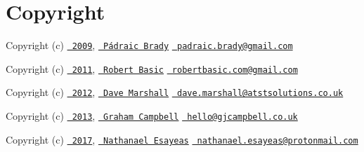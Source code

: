 \chapter{Copyright}
\hypertarget{md_vendor_2mockery_2mockery_2_c_o_p_y_r_i_g_h_t}{}\label{md_vendor_2mockery_2mockery_2_c_o_p_y_r_i_g_h_t}
\label{md_vendor_2mockery_2mockery_2_c_o_p_y_r_i_g_h_t_autotoc_md1153}%
%



\begin{DoxyItemize}
\item Copyright (c) \href{https://github.com/mockery/mockery/commit/1d96f88142abe804ab9e893a5f07933f63e9bff9}{\texttt{ 2009}}, \href{https://github.com/padraic}{\texttt{ Pádraic Brady}} \href{mailto:padraic.brady@gmail.com}{\texttt{ padraic.\+brady@gmail.\+com}}
\item Copyright (c) \href{https://github.com/mockery/mockery/commit/94dbb63aab37c659f63ea6e34acc6958928b0f59}{\texttt{ 2011}}, \href{https://github.com/robertbasic}{\texttt{ Robert Basic}} \href{mailto:robertbasic.com@gmail.com}{\texttt{ robertbasic.\+com@gmail.\+com}}
\item Copyright (c) \href{https://github.com/mockery/mockery/commit/64e3ad6960eb3202b5b91b91a4ef1cf6252f0fef}{\texttt{ 2012}}, \href{https://github.com/davedevelopment}{\texttt{ Dave Marshall}} \href{mailto:dave.marshall@atstsolutions.co.uk}{\texttt{ dave.\+marshall@atstsolutions.\+co.\+uk}}
\item Copyright (c) \href{https://github.com/mockery/mockery/commit/270ddd0bd051251e36a5688c52fc2638a097b110}{\texttt{ 2013}}, \href{https://github.com/GrahamCampbell}{\texttt{ Graham Campbell}} \href{mailto:hello@gjcampbell.co.uk}{\texttt{ hello@gjcampbell.\+co.\+uk}}
\item Copyright (c) \href{https://github.com/mockery/mockery/commit/ba28b84c416b95924886bbd64a6a2f68e863536a}{\texttt{ 2017}}, \href{https://github.com/ghostwriter}{\texttt{ Nathanael Esayeas}} \href{mailto:nathanael.esayeas@protonmail.com}{\texttt{ nathanael.\+esayeas@protonmail.\+com}} 
\end{DoxyItemize}